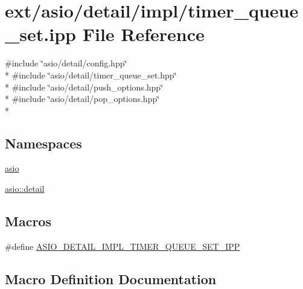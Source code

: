 \hypertarget{timer__queue__set_8ipp}{}\section{ext/asio/detail/impl/timer\+\_\+queue\+\_\+set.ipp File Reference}
\label{timer__queue__set_8ipp}
{\ttfamily \#include \char`\"{}asio/detail/config.\+hpp\char`\"{}}\\*
{\ttfamily \#include \char`\"{}asio/detail/timer\+\_\+queue\+\_\+set.\+hpp\char`\"{}}\\*
{\ttfamily \#include \char`\"{}asio/detail/push\+\_\+options.\+hpp\char`\"{}}\\*
{\ttfamily \#include \char`\"{}asio/detail/pop\+\_\+options.\+hpp\char`\"{}}\\*
\subsection*{Namespaces}
\begin{DoxyCompactItemize}
\item 
 \hyperlink{namespaceasio}{asio}
\item 
 \hyperlink{namespaceasio_1_1detail}{asio\+::detail}
\end{DoxyCompactItemize}
\subsection*{Macros}
\begin{DoxyCompactItemize}
\item 
\#define \hyperlink{timer__queue__set_8ipp_af97f9716ed7c24f2b82c7a83af6bb1b3}{A\+S\+I\+O\+\_\+\+D\+E\+T\+A\+I\+L\+\_\+\+I\+M\+P\+L\+\_\+\+T\+I\+M\+E\+R\+\_\+\+Q\+U\+E\+U\+E\+\_\+\+S\+E\+T\+\_\+\+I\+P\+P}
\end{DoxyCompactItemize}


\subsection{Macro Definition Documentation}
\hypertarget{timer__queue__set_8ipp_af97f9716ed7c24f2b82c7a83af6bb1b3}{}
